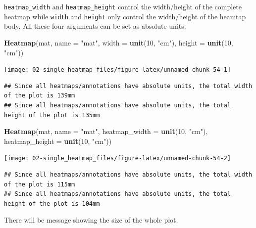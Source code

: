\documentclass[]{book}
\newenvironment{Shaded}{\begin{snugshade}}{\end{snugshade}}
\newcommand{\KeywordTok}[1]{\textcolor[rgb]{0.13,0.29,0.53}{\textbf{#1}}}
\newcommand{\DataTypeTok}[1]{\textcolor[rgb]{0.13,0.29,0.53}{#1}}
\newcommand{\DecValTok}[1]{\textcolor[rgb]{0.00,0.00,0.81}{#1}}
\newcommand{\StringTok}[1]{\textcolor[rgb]{0.31,0.60,0.02}{#1}}
\newcommand{\NormalTok}[1]{#1}
\theoremstyle{definition}
\theoremstyle{definition}
\theoremstyle{definition}
\theoremstyle{remark}
\begin{document}
\texttt{heatmap\_width} and \texttt{heatmap\_height} control the
width/height of the complete heatmap while \texttt{width} and
\texttt{height} only control the width/height of the heamtap body. All
these four arguments can be set as absolute units.

\begin{Shaded}
\begin{Highlighting}[]
\KeywordTok{Heatmap}\NormalTok{(mat, }\DataTypeTok{name =} \StringTok{"mat"}\NormalTok{, }\DataTypeTok{width =} \KeywordTok{unit}\NormalTok{(}\DecValTok{10}\NormalTok{, }\StringTok{"cm"}\NormalTok{), }\DataTypeTok{height =} \KeywordTok{unit}\NormalTok{(}\DecValTok{10}\NormalTok{, }\StringTok{"cm"}\NormalTok{))}
\end{Highlighting}
\end{Shaded}

\begin{center}\texttt{[image: 02-single\_heatmap\_files/figure-latex/unnamed-chunk-54-1]} \end{center}

\begin{verbatim}
## Since all heatmaps/annotations have absolute units, the total width of the plot is 139mm
## Since all heatmaps/annotations have absolute units, the total height of the plot is 135mm
\end{verbatim}

\begin{Shaded}
\begin{Highlighting}[]
\KeywordTok{Heatmap}\NormalTok{(mat, }\DataTypeTok{name =} \StringTok{"mat"}\NormalTok{, }\DataTypeTok{heatmap_width =} \KeywordTok{unit}\NormalTok{(}\DecValTok{10}\NormalTok{, }\StringTok{"cm"}\NormalTok{), }\DataTypeTok{heatmap_height =} \KeywordTok{unit}\NormalTok{(}\DecValTok{10}\NormalTok{, }\StringTok{"cm"}\NormalTok{))}
\end{Highlighting}
\end{Shaded}

\begin{center}\texttt{[image: 02-single\_heatmap\_files/figure-latex/unnamed-chunk-54-2]} \end{center}

\begin{verbatim}
## Since all heatmaps/annotations have absolute units, the total width of the plot is 115mm
## Since all heatmaps/annotations have absolute units, the total height of the plot is 104mm
\end{verbatim}

There will be message showing the size of the whole plot.
\end{document}
